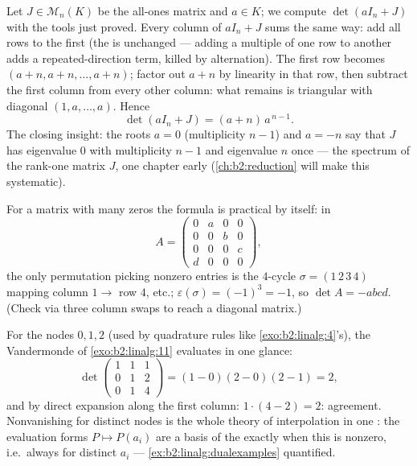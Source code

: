 \begin{example}\label{ex:b2:linalg:onesmatrix}
Let $J \in \mathcal{M}_n(K)$ be the all-ones matrix and $a \in K$;
we compute $\det(aI_n + J)$ with the tools just proved. Every
column of $aI_n + J$ sums the same way: add all rows to the first
(the  is unchanged --- adding a multiple of one row to
another adds a repeated-direction term, killed by alternation).
The first row becomes $(a + n, a + n, \dots, a + n)$; factor out
$a + n$ by linearity in that row, then subtract the first column
from every other column: what remains is triangular with diagonal
$(1, a, \dots, a)$. Hence
\[
\det(aI_n + J) = (a + n)\,a^{\,n-1}.
\]
The closing insight: the roots $a = 0$ (multiplicity $n - 1$) and
$a = -n$ say that $J$ has eigenvalue $0$ with multiplicity $n - 1$
and eigenvalue $n$ once --- the spectrum of the rank-one matrix
$J$, one chapter early (\cref{ch:b2:reduction} will make this
systematic).
\end{example}

\begin{example}\label{ex:b2:linalg:permexample}
For a matrix with many zeros the formula is practical by itself:
in
\[
A = \begin{pmatrix}
0 & a & 0 & 0\\
0 & 0 & b & 0\\
0 & 0 & 0 & c\\
d & 0 & 0 & 0
\end{pmatrix},
\]
the only permutation picking nonzero entries is the $4$-cycle
$\sigma = (1\,2\,3\,4)$ mapping column $1 \to$ row $4$, etc.;
$\varepsilon(\sigma) = (-1)^3 = -1$, so $\det A = -abcd$. (Check
via three column swaps to reach a diagonal matrix.)
\end{example}

\begin{example}\label{ex:b2:linalg:vandermondework}
For the nodes $0, 1, 2$ (used by quadrature rules like
\cref{exo:b2:linalg:4}'s), the Vandermonde  of
\cref{exo:b2:linalg:11} evaluates in one glance:
\[
\det\begin{pmatrix}
1 & 1 & 1\\
0 & 1 & 2\\
0 & 1 & 4
\end{pmatrix}
= (1 - 0)(2 - 0)(2 - 1) = 2 ,
\]
and by direct expansion along the first column: $1\cdot(4 - 2)
= 2$: agreement. Nonvanishing for distinct nodes is the whole
theory of interpolation in one : the evaluation
forms $P \mapsto P(a_i)$ are a basis of the  exactly when
this  is nonzero, i.e.\ always for distinct $a_i$
--- \cref{ex:b2:linalg:dualexamples} quantified.
\end{example}


